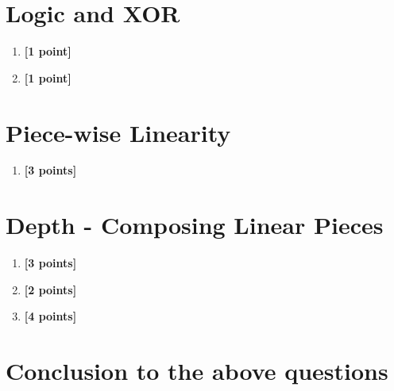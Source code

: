 \documentclass[11pt,english]{article}
\begin{document}
\section{Logic and XOR}
\begin{enumerate}[resume]

\item
\textbf{[1 point]}


\item
\textbf{[1 point]}


\end{enumerate}

\section{Piece-wise Linearity}

\begin{enumerate}[resume]

\item 
\textbf{[3 points]}

    
\end{enumerate}


\section{Depth - Composing Linear Pieces}

\begin{enumerate}[resume]

\item 
\textbf{[3 points]}


\item
\textbf{[2 points]}


\item
\textbf{[4 points]}


\end{enumerate}

\section*{Conclusion to the above questions}


    
\end{document}
